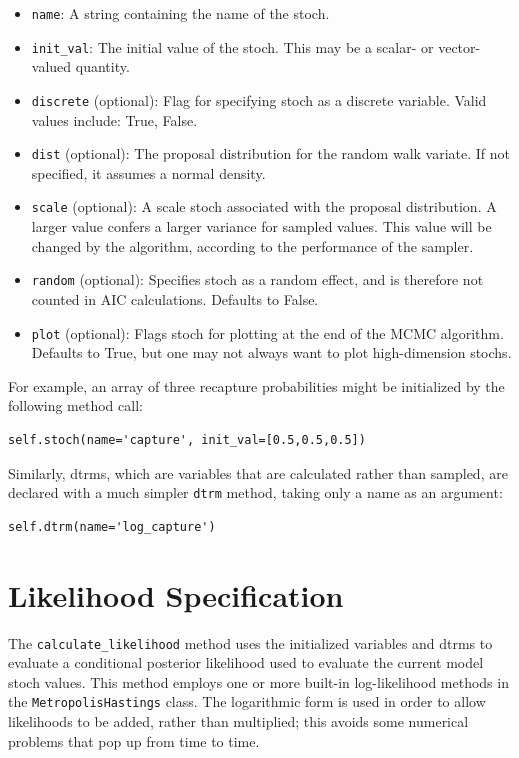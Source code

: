 \documentclass[]{book}
\begin{document}
\begin{itemize}

\item \verb=name=: A string containing the name of the stoch.
\item \verb=init_val=: The initial value of the stoch. This may be a scalar- or vector-valued quantity.
\item \verb=discrete= (optional): Flag for specifying stoch as a discrete variable. Valid values include: True, False.
\item \verb=dist= (optional): The proposal distribution for the random walk variate. If not specified, it assumes a normal density.
\item \verb=scale= (optional): A scale stoch associated with the proposal distribution. A larger value confers a larger variance for sampled values. This value will be changed by the algorithm, according to the performance of the sampler.
\item \verb=random= (optional): Specifies stoch as a random effect, and is therefore not counted in AIC calculations. Defaults to False.
\item \verb=plot= (optional): Flags stoch for plotting at the end of the MCMC algorithm. Defaults to True, but one may not always want to plot high-dimension stochs.
\end{itemize}
For example, an array of three recapture probabilities might be initialized by the following method call:
\begin{verbatim}
self.stoch(name='capture', init_val=[0.5,0.5,0.5])
\end{verbatim}

Similarly, dtrms, which are variables that are calculated rather than sampled, are declared with a much simpler \verb=dtrm= method, taking only a name as an argument:
\begin{verbatim}
self.dtrm(name='log_capture')
\end{verbatim}

\section{Likelihood Specification}\label{sec:likelihood_specification}

The \verb=calculate_likelihood= method uses the initialized variables and dtrms to evaluate a conditional posterior likelihood used to evaluate the current model stoch values. This method employs one or more built-in log-likelihood methods in the \verb=MetropolisHastings= class. The logarithmic form is used in order to allow likelihoods to be added, rather than multiplied; this avoids some numerical problems that pop up from time to time.
\end{document}
